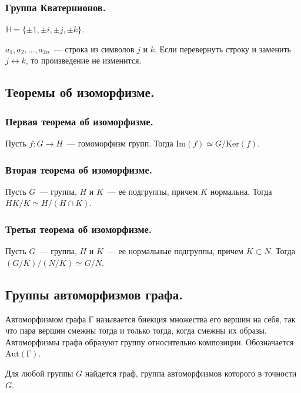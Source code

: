 \documentclass[12pt]{article}
\newcommand{\Img}[1]{\text{Im}(#1)}
\newcommand{\Ker}[1]{\text{Ker}(#1)}
\newcommand{\Aut}[1]{\text{Aut}(#1)}
\begin{document}
	\subsubsection{Группа Кватернионов.}
	$\mathbb{H} = \{ \pm 1, \pm i, \pm j, \pm k \}$.
	\begin{lemma}
		$a_1, a_2, \dots, a_{2n}$~--- строка из символов $j$ и $k$. Если перевернуть строку и заменить $j \leftrightarrow k$, то произведение не изменится.
	\end{lemma}
	\subsection{Теоремы об изоморфизме.}
	\subsubsection{Первая теорема об изоморфизме.}
	\begin{theorem}
		Пусть $f : G \rightarrow H$~--- гомоморфизм групп. Тогда $\Img{f} \simeq G / \Ker{f}$.
	\end{theorem}
	\subsubsection{Вторая теорема об изоморфизме.}
	\begin{theorem}
		Пусть $G$~--- группа, $H$ и $K$~--- ее подгруппы, причем $K$ нормальна. Тогда $HK / K \simeq H / (H \cap K)$.
	\end{theorem}
	\subsubsection{Третья теорема об изоморфизме.}
	\begin{theorem}
		Пусть $G$~--- группа, $H$ и $K$~--- ее нормальные подгруппы, причем $K \subset N$. Тогда $(G / K) / (N / K) \simeq G / N$.
	\end{theorem}
	\subsection{Группы автоморфизмов графа.}
	\begin{definition}
		Автоморфизмом графа Г называется биекция множества его вершин на себя, так что пара вершин смежны тогда и только тогда, когда смежны их образы. Автоморфизмы графа образуют группу относительно композиции. Обозначается $\Aut{\text{Г}}$.
	\end{definition}
	\begin{theorem}[Фрухта]
		Для любой группы $G$ найдется граф, группа автоморфизмов которого в точности $G$.
	\end{theorem}
\end{document}
